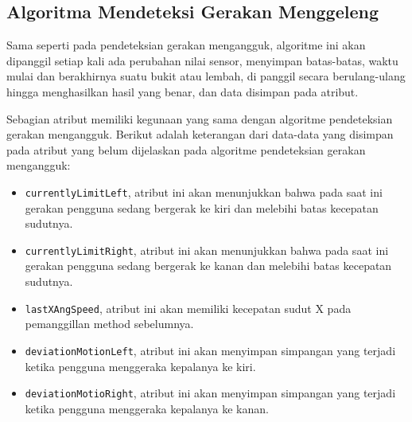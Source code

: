 \subsection{Algoritma Mendeteksi Gerakan Menggeleng}
\label{ssec:algoritme_mendeteksi_gerakan_menggeleng}

Sama seperti pada pendeteksian gerakan mengangguk, algoritme ini akan dipanggil setiap kali ada perubahan nilai sensor, menyimpan batas-batas, waktu mulai dan berakhirnya suatu bukit atau lembah, di panggil secara berulang-ulang hingga menghasilkan hasil yang benar, dan data disimpan pada atribut.

Sebagian atribut memiliki kegunaan yang sama dengan algoritme pendeteksian gerakan mengangguk. Berikut adalah keterangan dari data-data yang disimpan pada atribut yang belum dijelaskan pada algoritme pendeteksian gerakan mengangguk:
\begin{itemize}
	\item \texttt{currentlyLimitLeft}, atribut ini akan menunjukkan bahwa pada saat ini gerakan pengguna sedang bergerak ke kiri dan melebihi batas kecepatan sudutnya.
	\item \texttt{currentlyLimitRight}, atribut ini akan menunjukkan bahwa pada saat ini gerakan pengguna sedang bergerak ke kanan dan melebihi batas kecepatan sudutnya.
	\item \texttt{lastXAngSpeed}, atribut ini akan memiliki kecepatan sudut X pada pemanggillan method sebelumnya. 
	\item \texttt{deviationMotionLeft}, atribut ini akan menyimpan simpangan yang terjadi ketika pengguna menggeraka kepalanya ke kiri. 
	\item \texttt{deviationMotioRight}, atribut ini akan menyimpan simpangan yang terjadi ketika pengguna menggeraka kepalanya ke kanan. 
\end{itemize}


